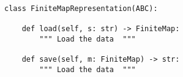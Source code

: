 \begin{verbatim}
class FiniteMapRepresentation(ABC):

    def load(self, s: str) -> FiniteMap:
        """ Load the data  """

    def save(self, m: FiniteMap) -> str:
        """ Load the data  """
\end{verbatim}